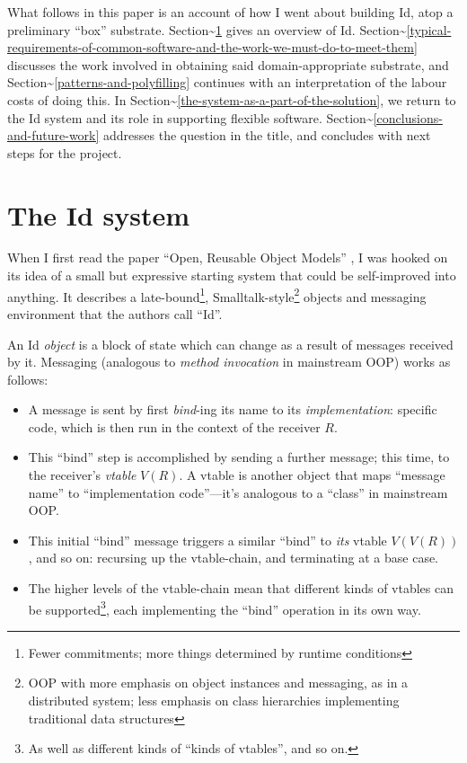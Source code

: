 What follows in this paper is an account of how I went about building
Id, atop a preliminary ``box'' substrate.
Section\textasciitilde{}\ref{the-system} gives an overview of Id.
Section\textasciitilde{}\ref{typical-requirements-of-common-software-and-the-work-we-must-do-to-meet-them}
discusses the work involved in obtaining said domain-appropriate
substrate, and Section\textasciitilde{}\ref{patterns-and-polyfilling}
continues with an interpretation of the labour costs of doing this. In
Section\textasciitilde{}\ref{the-system-as-a-part-of-the-solution}, we
return to the Id system and its role in supporting flexible software.
Section\textasciitilde{}\ref{conclusions-and-future-work} addresses the
question in the title, and concludes with next steps for the project.

\hypertarget{the-system}{%
\section{\texorpdfstring{The Id{}
system}{The  system}}\label{the-system}}

When I first read the paper ``Open, Reusable Object Models''
\cite{OROM}, I was hooked on its idea of a small but expressive starting
system that could be self-improved into anything. It describes a
late-bound\footnote{Fewer commitments; more things determined by runtime
  conditions}, Smalltalk-style\footnote{OOP with more emphasis on object
  instances and messaging, as in a distributed system; less emphasis on
  class hierarchies implementing traditional data structures} objects
and messaging environment that the authors call ``Id''.

An Id{} \emph{object} is a block of state which can change as a result
of messages received by it. Messaging (analogous to \emph{method
invocation} in mainstream OOP) works as follows:

\begin{itemize}
\tightlist
\item
  A message is sent by first \emph{bind}-ing its name to its
  \emph{implementation}: specific code, which is then run in the context
  of the receiver \(R\).
\item
  This ``bind'' step is accomplished by sending a further message; this
  time, to the receiver's \emph{vtable} \(V(R)\). A vtable is another
  object that maps ``message name'' to ``implementation code''---it's
  analogous to a ``class'' in mainstream OOP.
\item
  This initial ``bind'' message triggers a similar ``bind'' to
  \emph{its} vtable \(V(V(R))\), and so on: recursing up the
  vtable-chain, and terminating at a base case.
\item
  The higher levels of the vtable-chain mean that different kinds of
  vtables can be supported\footnote{As well as different kinds of
    ``kinds of vtables'', and so on.}, each implementing the ``bind''
  operation in its own way.
\end{itemize}

